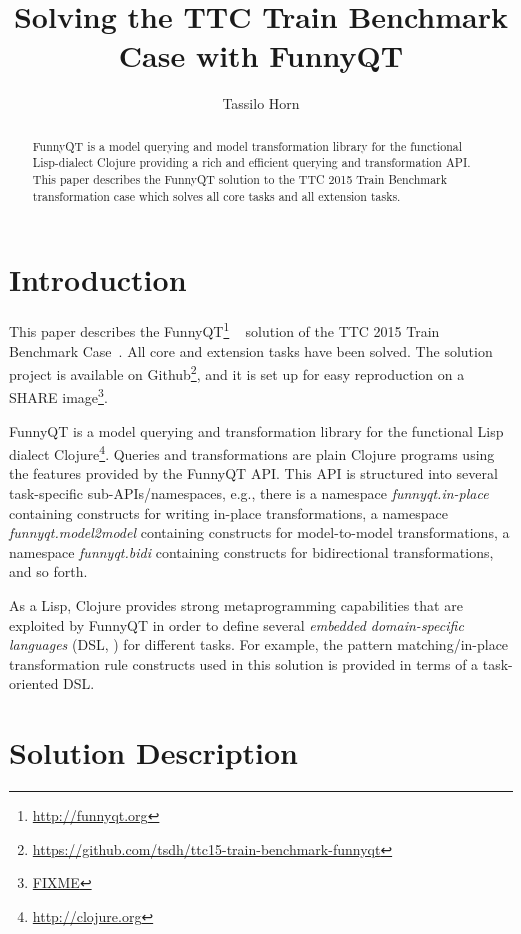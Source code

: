 \documentclass[submission]{eptcs}
\title{Solving the TTC Train Benchmark Case with FunnyQT}
\author{Tassilo Horn
  \institute{Institute for Software Technology, University Koblenz-Landau, Germany}
  \email{horn@uni-koblenz.de}}
\begin{document}
\maketitle

\begin{abstract}
  FunnyQT is a model querying and model transformation library for the
  functional Lisp-dialect Clojure providing a rich and efficient querying and
  transformation API.  This paper describes the FunnyQT solution to the TTC
  2015 Train Benchmark transformation case which solves all core tasks and all
  extension tasks.
\end{abstract}


\section{Introduction}
\label{sec:introduction}

This paper describes the FunnyQT\footnote{\url{http://funnyqt.org}}
~\cite{Horn2013MQWFQ} solution of the TTC 2015 Train Benchmark
Case~\cite{train-benchmark-case-desc}.  All core and extension tasks have been
solved.  The solution project is available on
Github\footnote{\url{https://github.com/tsdh/ttc15-train-benchmark-funnyqt}},
and it is set up for easy reproduction on a SHARE image\footnote{\url{FIXME}}.

FunnyQT is a model querying and transformation library for the functional Lisp
dialect Clojure\footnote{\url{http://clojure.org}}.  Queries and
transformations are plain Clojure programs using the features provided by the
FunnyQT API.  This API is structured into several task-specific
sub-APIs/namespaces, e.g., there is a namespace \emph{funnyqt.in-place}
containing constructs for writing in-place transformations, a namespace
\emph{funnyqt.model2model} containing constructs for model-to-model
transformations, a namespace \emph{funnyqt.bidi} containing constructs for
bidirectional transformations, and so forth.

As a Lisp, Clojure provides strong metaprogramming capabilities that are
exploited by FunnyQT in order to define several \emph{embedded domain-specific
  languages} (DSL, \cite{book:Fowler2010DSL}) for different tasks.  For
example, the pattern matching/in-place transformation rule constructs used in
this solution is provided in terms of a task-oriented DSL.


\section{Solution Description}
\label{sec:solution-description}
\end{document}
